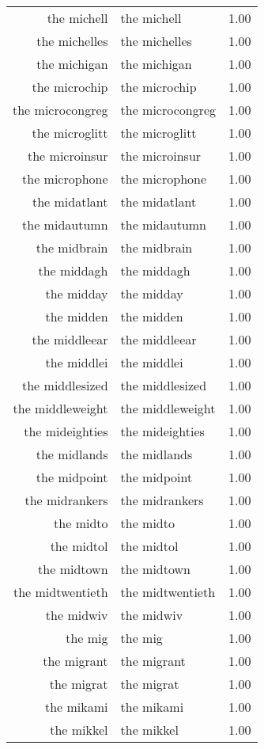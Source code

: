 \begin{table}[ht]
\begin{tabular}{rlr}
  the michell & the michell & 1.00 \\ 
  the michelles & the michelles & 1.00 \\ 
  the michigan & the michigan & 1.00 \\ 
  the microchip & the microchip & 1.00 \\ 
  the microcongreg & the microcongreg & 1.00 \\ 
  the microglitt & the microglitt & 1.00 \\ 
  the microinsur & the microinsur & 1.00 \\ 
  the microphone & the microphone & 1.00 \\ 
  the midatlant & the midatlant & 1.00 \\ 
  the midautumn & the midautumn & 1.00 \\ 
  the midbrain & the midbrain & 1.00 \\ 
  the middagh & the middagh & 1.00 \\ 
  the midday & the midday & 1.00 \\ 
  the midden & the midden & 1.00 \\ 
  the middleear & the middleear & 1.00 \\ 
  the middlei & the middlei & 1.00 \\ 
  the middlesized & the middlesized & 1.00 \\ 
  the middleweight & the middleweight & 1.00 \\ 
  the mideighties & the mideighties & 1.00 \\ 
  the midlands & the midlands & 1.00 \\ 
  the midpoint & the midpoint & 1.00 \\ 
  the midrankers & the midrankers & 1.00 \\ 
  the midto & the midto & 1.00 \\ 
  the midtol & the midtol & 1.00 \\ 
  the midtown & the midtown & 1.00 \\ 
  the midtwentieth & the midtwentieth & 1.00 \\ 
  the midwiv & the midwiv & 1.00 \\ 
  the mig & the mig & 1.00 \\ 
  the migrant & the migrant & 1.00 \\ 
  the migrat & the migrat & 1.00 \\ 
  the mikami & the mikami & 1.00 \\ 
  the mikkel & the mikkel & 1.00 \\ 

\end{tabular}
\end{table}
